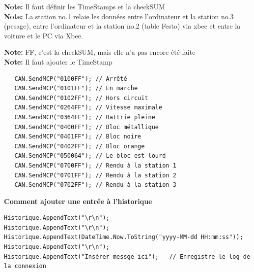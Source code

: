\documentclass[10pt,a4paper,final]{article}
\begin{document}
\begin{spacing}{1.5}
\begin{table}[!ht]
\label{tab:testtab1}
\end{table}
\begin{flushleft}
\textbf{Note:} Il faut définir les TimeStamps et la checkSUM\\
\textbf{Note:} La station no.1 relaie les données entre l'ordinateur et la station no.3 (pesage), entre l'ordinateur et la station no.2 (table Festo) via xbee et entre la voiture et le PC via Xbee.
\end{flushleft}
\pagebreak
\textbf{Note:} FF, c'est la checkSUM, mais elle n'a pas encore été faite \\
\textbf{Note:} Il faut ajouter le TimeStamp 
\begin{verbatim}
   CAN.SendMCP("0100FF"); // Arrêté
   CAN.SendMCP("0101FF"); // En marche
   CAN.SendMCP("0102FF"); // Hors circuit
   CAN.SendMCP("0264FF"); // Vitesse maximale
   CAN.SendMCP("0364FF"); // Battrie pleine
   CAN.SendMCP("0400FF"); // Bloc métallique
   CAN.SendMCP("0401FF"); // Bloc noire
   CAN.SendMCP("0402FF"); // Bloc orange
   CAN.SendMCP("050064"); // Le bloc est lourd
   CAN.SendMCP("0700FF"); // Rendu à la station 1
   CAN.SendMCP("0701FF"); // Rendu à la station 2
   CAN.SendMCP("0702FF"); // Rendu à la station 3
\end{verbatim}

\pagebreak

\end{spacing}

\textbf{Comment ajouter une entrée à l'historique}
\begin{lstlisting}
Historique.AppendText("\r\n");
Historique.AppendText("\r\n");
Historique.AppendText(DateTime.Now.ToString("yyyy-MM-dd HH:mm:ss"));
Historique.AppendText("\r\n");
Historique.AppendText("Insérer messge ici");   // Enregistre le log de la connexion
\end{lstlisting}

\begin{center}
\HRule
\end{center}
\end{document}

